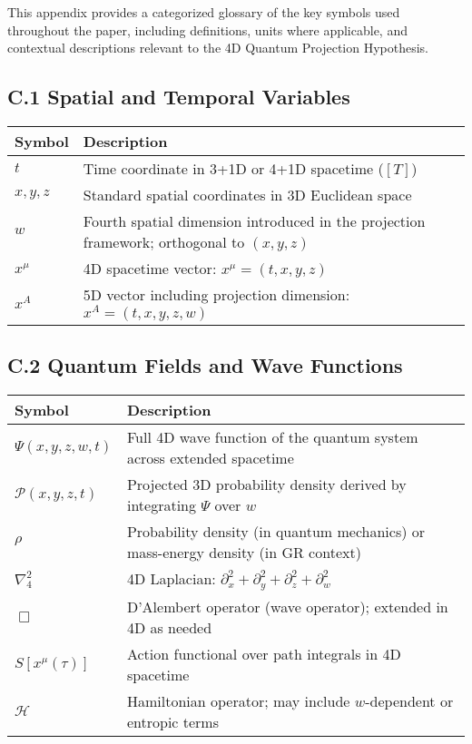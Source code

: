 \documentclass[12pt]{article}
\begin{document}
\noindent
This appendix provides a categorized glossary of the key symbols used throughout the paper, including definitions, units where applicable, and contextual descriptions relevant to the 4D Quantum Projection Hypothesis.

\vspace{1em}
\subsection*{C.1 Spatial and Temporal Variables}
\begin{longtable}{p{3cm} p{11cm}}
\toprule
\textbf{Symbol} & \textbf{Description} \\
\midrule
$t$ & Time coordinate in 3+1D or 4+1D spacetime ($[T]$) \\
$x, y, z$ & Standard spatial coordinates in 3D Euclidean space \\
$w$ & Fourth spatial dimension introduced in the projection framework; orthogonal to $(x, y, z)$ \\
$x^\mu$ & 4D spacetime vector: $x^\mu = (t, x, y, z)$ \\
$x^A$ & 5D vector including projection dimension: $x^A = (t, x, y, z, w)$ \\
\bottomrule
\end{longtable}

\vspace{1em}
\subsection*{C.2 Quantum Fields and Wave Functions}
\begin{longtable}{p{3cm} p{11cm}}
\toprule
\textbf{Symbol} & \textbf{Description} \\
\midrule
$\Psi(x, y, z, w, t)$ & Full 4D wave function of the quantum system across extended spacetime \\
$\mathcal{P}(x, y, z, t)$ & Projected 3D probability density derived by integrating $\Psi$ over $w$ \\
$\rho$ & Probability density (in quantum mechanics) or mass-energy density (in GR context) \\
$\nabla_4^2$ & 4D Laplacian: $\partial_x^2 + \partial_y^2 + \partial_z^2 + \partial_w^2$ \\
$\Box$ & D'Alembert operator (wave operator); extended in 4D as needed \\
$S[x^\mu(\tau)]$ & Action functional over path integrals in 4D spacetime \\
$\mathcal{H}$ & Hamiltonian operator; may include $w$-dependent or entropic terms \\
\bottomrule
\end{longtable}
\end{document}
